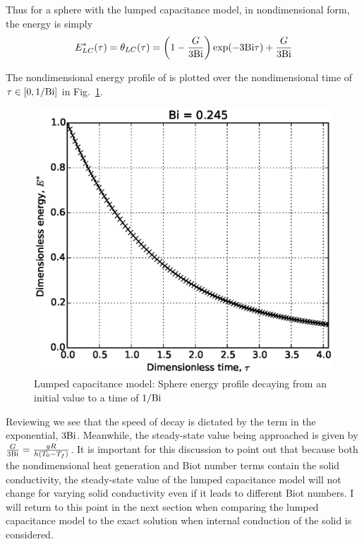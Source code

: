 Thus for a sphere with the lumped capacitance model, in nondimensional form, the energy is simply
\begin{equation}\label{eq:lc-energy-profile}
	E^*_{LC}(\tau) = \theta_{LC}(\tau) = \left(1-\frac{G}{3\mathrm{Bi}}\right)\exp(-3\mathrm{Bi} \tau) + \frac{G}{3\mathrm{Bi}}
\end{equation}

The nondimensional energy profile of  is plotted over the nondimensional time of $\tau \in [0,1/\mathrm{Bi}]$ in Fig.~\ref{fig:LC-sphere-in-fluid}. 

\begin{figure}[ht]
	\centering
		\includegraphics[width=\singleimagewidth]{figures/LC-sphere-in-fluid}
	\caption[Lumped Capacitance energy profile]{Lumped capacitance model: Sphere energy profile decaying from an initial value to a time of $1/\mathrm{Bi}$}
	\label{fig:LC-sphere-in-fluid}
\end{figure}

Reviewing  we see that the speed of decay is dictated by the term in the exponential, $3\mathrm{Bi}$. Meanwhile, the steady-state value being approached is given by $\frac{G}{3\mathrm{Bi}} = \frac{gR}{h(T_0 - T_f)}$. It is important for this discussion to point out that because both the nondimensional heat generation and Biot number terms contain the solid conductivity, the steady-state value of the lumped capacitance model will not change for varying solid conductivity even if it leads to different Biot numbers. I will return to this point in the next section when comparing the lumped capacitance model to the exact solution when internal conduction of the solid is considered.



